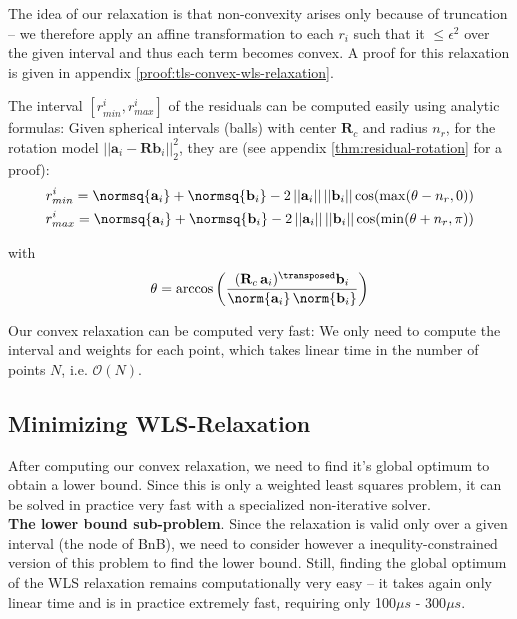 The idea of our relaxation is that non-convexity arises only because of truncation -- we therefore apply an affine transformation to each $r_i$ such that it $\leq \epsilon^2$ over the given interval and thus each term becomes convex. A proof for this relaxation is given in appendix \ref{proof:tls-convex-wls-relaxation}.

The interval $[r_{min}^i, r_{max}^i]$ of the residuals can be computed easily using analytic formulas: Given spherical intervals (balls) with center $\mathbf{R}_c$ and radius $n_r$, for the rotation model $||\mathbf{a}_i - \mathbf{R} \mathbf{b}_i||_2^2$, they are (see appendix \ref{thm:residual-rotation} for a proof):
\begin{equation}
	\label{eq:residual-minmax-rotation}
	\begin{aligned}
		r_{min}^i = \normsq{\mathbf{a}_i} + \normsq{\mathbf{b}_i} - 2 \, ||\mathbf{a}_i|| \, ||\mathbf{b}_i|| \cos (\max(\theta - n_r, 0))\\
		r_{max}^i = \normsq{\mathbf{a}_i} + \normsq{\mathbf{b}_i} - 2 \, ||\mathbf{a}_i|| \, ||\mathbf{b}_i|| \cos (\min(\theta + n_r, \pi))
	\end{aligned}
\end{equation}

with 
\begin{equation}
	\begin{aligned}
		\theta = \arccos \left(\frac{(\mathbf{R}_c \, \mathbf{a}_i)^\transposed\mathbf{b}_i}{\norm{\mathbf{a}_i} \, \norm{\mathbf{b}_i}} \right)
	\end{aligned}
\end{equation}

Our convex relaxation can be computed very fast: We only need to compute the interval and weights for each point, which takes linear time in the number of points $N$, i.e. $\mathcal{O}(N)$.

\subsection{Minimizing WLS-Relaxation}
After computing our convex relaxation, we need to find it's global optimum to obtain a lower bound.
Since this is only a weighted least squares problem, it can be solved in practice very fast with a specialized non-iterative solver.\\
\textbf{The lower bound sub-problem}. Since the relaxation is valid only over a given interval (the node of BnB), we need to consider however a inequlity-constrained version of this problem to find the lower bound. 
Still, finding the global optimum of the WLS relaxation remains computationally very easy -- it takes again only linear time and is in practice extremely fast, requiring only 100$\mu s$ - 300$\mu s$.

